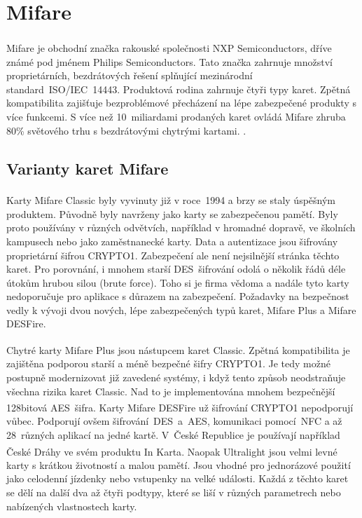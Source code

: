 \section{Mifare\textsuperscript{\textregistered}}
Mifare\textsuperscript{\textregistered} je obchodní značka rakouské společnosti NXP Semiconductors, dříve známé pod jménem Philips Semiconductors. Tato značka zahrnuje množství proprietárních, bezdrátových řešení splňující mezinárodní standard~ISO/IEC~14443. Produktová rodina zahrnuje čtyři typy karet. Zpětná kompatibilita zajišťuje bezproblémové přecházení na lépe zabezpečené produkty s více funkcemi. S více než 10~miliardami prodaných karet ovládá Mifare zhruba 80\% světového trhu s bezdrátovými chytrými kartami. 
\cite{About_Mifare}\cite{Dismantling_Mifare_Classic}.

\subsection{Varianty karet Mifare}

Karty Mifare Classic\textsuperscript{\textregistered} byly vyvinuty již v roce~1994 a brzy se staly úspěšným produktem. Původně byly navrženy jako karty se zabezpečenou pamětí. Byly proto používány v různých odvětvích, například v hromadné dopravě, ve školních kampusech nebo jako zaměstnanecké karty. Data a autentizace jsou šifrovány proprietární šifrou CRYPTO1. Zabezpečení ale není nejsilnější stránka těchto karet. Pro porovnání, i mnohem starší DES~šifrování odolá o několik řádů déle útokům hrubou silou (brute force). Toho si je firma vědoma a nadále tyto karty nedoporučuje pro aplikace s důrazem na zabezpečení. Požadavky na bezpečnost vedly k vývoji dvou nových, lépe zabezpečených typů karet, Mifare Plus a Mifare DESFire\cite{Mifare_Classic_story}\cite{Mifare_Classic_Official_about}. 
\par
Chytré karty Mifare Plus\textsuperscript{\textregistered} jsou nástupcem karet Classic. Zpětná kompatibilita je zajištěna podporou starší a méně bezpečné šifry CRYPTO1. Je tedy možné postupně modernizovat již zavedené systémy, i když tento způsob neodstraňuje všechna rizika karet Classic. Nad to je implementována mnohem bezpečnější 128bitová AES~šifra\cite{Mifare_Plus_Official}. Karty Mifare DESFire\textsuperscript{\textregistered} už šifrování CRYPTO1 nepodporují vůbec. Podporují ovšem šifrování~DES~a~AES, komunikaci pomocí~NFC a až 28~různých aplikací na jedné kartě\cite{Mifare_DESFire_Official}. V~České Republice je používají například České Dráhy ve svém produktu In Karta\cite{Ceske_Drahy_Podminky_InKarta}. Naopak Ultralight\textsuperscript{\textregistered} jsou velmi levné karty s krátkou životností a malou pamětí. Jsou vhodné pro jednorázové použití jako celodenní jízdenky nebo vstupenky na velké události\cite{Mifare_Ultralight_Official}. Každá z těchto karet se dělí na další dva až čtyři podtypy, které se liší v různých parametrech nebo nabízených vlastnostech karty.

